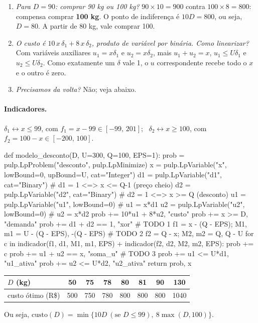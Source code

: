 \begin{discussao}
\begin{enumerate}
  \item \emph{Para $D=90$: comprar 90 kg ou 100 kg?} $90\times10=900$ contra $100\times8=800$: compensa comprar
  \textbf{100 kg}. O ponto de indiferença é $10D=800$, ou seja, $D=80$. A partir de 80 kg, vale comprar 100.
  \item \emph{O custo é $10\,x\,\delta_1+8\,x\,\delta_2$, produto de variável por binária. Como linearizar?} Com
  variáveis auxiliares $u_1=x\delta_1$ e $u_2=x\delta_2$, mais $u_1+u_2=x$, $u_1\le U\delta_1$ e $u_2\le U\delta_2$.
  Como exatamente um $\delta$ vale 1, o $u$ correspondente recebe todo o $x$ e o outro é zero.
  \item \emph{Precisamos da volta?} Não; veja abaixo.
\end{enumerate}
\end{discussao}

\paragraph{Indicadores.} $\delta_1\leftrightarrow x\le99$, com $f_1=x-99\in[-99,\,201]$; \ $\delta_2\leftrightarrow
x\ge100$, com $f_2=100-x\in[-200,\,100]$.

\begin{codigo}
def modelo_desconto(D, U=300, Q=100, EPS=1):
    prob = pulp.LpProblem("desconto", pulp.LpMinimize)
    x  = pulp.LpVariable("x", lowBound=0, upBound=U, cat="Integer")
    d1 = pulp.LpVariable("d1", cat="Binary")      # d1 = 1 <=> x <= Q-1 (preço cheio)
    d2 = pulp.LpVariable("d2", cat="Binary")      # d2 = 1 <=> x >= Q   (desconto)
    u1 = pulp.LpVariable("u1", lowBound=0)        # u1 = x*d1
    u2 = pulp.LpVariable("u2", lowBound=0)        # u2 = x*d2
    prob += 10*u1 + 8*u2, "custo"
    prob += x >= D, "demanda"
    prob += d1 + d2 == 1, "xor"                                   # TODO 1
    f1 = x - (Q - EPS); M1, m1 = U - (Q - EPS), -(Q - EPS)        # TODO 2
    f2 = Q - x;         M2, m2 = Q, Q - U
    for c in indicador(f1, d1, M1, m1, EPS) + indicador(f2, d2, M2, m2, EPS):
        prob += c
    prob += u1 + u2 == x, "soma_u"                                # TODO 3
    prob += u1 <= U*d1, "u1_ativa"
    prob += u2 <= U*d2, "u2_ativa"
    return prob, x
\end{codigo}

\begin{center}
\begin{tabular}{lccccccc}
\toprule
$D$ (kg) & 50 & 75 & 78 & 80 & 81 & 90 & 130\\
\midrule
custo ótimo (R\$) & 500 & 750 & 780 & 800 & 800 & 800 & 1040\\
\bottomrule
\end{tabular}
\end{center}
Ou seja, $\text{custo}(D)=\min\{10D\ (\text{se } D\le99),\ 8\max(D,100)\}$.

